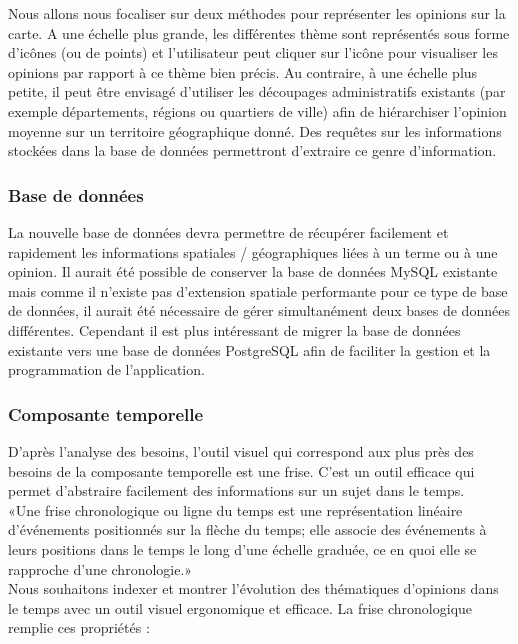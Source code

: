 Nous allons nous focaliser sur deux méthodes pour représenter les opinions sur la carte. A une échelle plus grande, les différentes thème sont représentés sous forme d'icônes (ou de points) et l'utilisateur peut cliquer sur l'icône pour visualiser les opinions par rapport à ce thème bien précis. Au contraire, à une échelle plus petite, il peut être envisagé d'utiliser les découpages administratifs existants (par exemple départements, régions ou quartiers de ville) afin de hiérarchiser l'opinion moyenne sur un territoire géographique donné. Des requêtes sur les informations stockées dans la base de données permettront d'extraire ce genre d'information.


\subsubsection{Base de données}

La nouvelle base de données devra permettre de récupérer facilement et rapidement les informations spatiales / géographiques liées à un terme ou à une opinion. Il aurait été possible de conserver la base de données MySQL existante mais comme il n'existe pas d'extension spatiale performante pour ce type de base de données, il aurait été nécessaire de gérer simultanément deux bases de données différentes. Cependant il est plus intéressant de migrer la base de données existante vers une base de données PostgreSQL afin de faciliter la gestion et la programmation de l'application.



\subsubsection{Composante temporelle}

 D'après l'analyse des besoins, l'outil visuel qui correspond aux plus près des besoins de la composante temporelle est une frise. C'est un outil efficace qui permet d'abstraire facilement des informations sur un sujet dans le temps. \\
 
«Une frise chronologique ou ligne du temps est une représentation linéaire d’événements positionnés sur la flèche du temps; elle associe des événements à leurs positions dans le temps le long d'une échelle graduée, ce en quoi elle se rapproche d'une chronologie.»\\

Nous souhaitons indexer et montrer l’évolution des thématiques d'opinions dans le temps avec un outil visuel ergonomique et efficace. La frise chronologique remplie ces propriétés :\\

